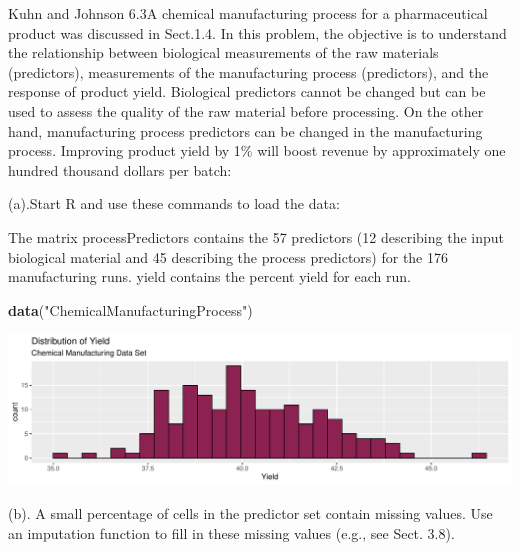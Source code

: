 \documentclass[]{report}
\newenvironment{Shaded}{\begin{snugshade}}{\end{snugshade}}
\newcommand{\KeywordTok}[1]{\textcolor[rgb]{0.13,0.29,0.53}{\textbf{#1}}}
\newcommand{\NormalTok}[1]{#1}
\newcommand{\StringTok}[1]{\textcolor[rgb]{0.31,0.60,0.02}{#1}}
\begin{document}

\begin{question}{Kuhn and Johnson 6.3}A chemical manufacturing process for a pharmaceutical product was discussed in Sect.1.4. In this problem, the objective is to understand the relationship between biological measurements of the raw materials (predictors), measurements of the manufacturing process (predictors), and the response of product yield. Biological predictors cannot be changed but can be used to assess the quality of the raw material before processing. On the other hand, manufacturing process predictors can be changed in the manufacturing process. Improving product yield by 1\% will boost revenue by approximately one hundred thousand dollars per batch:\end{question}

\begin{subquestion}{(a).}Start R and use these commands to load the data:
\end{subquestion}

The matrix processPredictors contains the 57 predictors (12 describing
the input biological material and 45 describing the process predictors)
for the 176 manufacturing runs. yield contains the percent yield for
each run.

\begin{Shaded}
\begin{Highlighting}[]
\KeywordTok{data}\NormalTok{(}\StringTok{"ChemicalManufacturingProcess"}\NormalTok{)}
\end{Highlighting}
\end{Shaded}

\includegraphics{Homework-Two_files/figure-latex/unnamed-chunk-2-1.pdf}

\begin{subquestion}{(b).} A small percentage of cells in the predictor set contain missing values. Use an imputation function to fill in these missing values (e.g., see Sect. 3.8). 
\end{subquestion}
\end{document}
